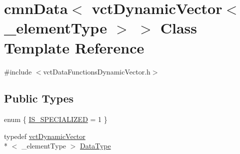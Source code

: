 \hypertarget{classcmn_data_3_01vct_dynamic_vector_3_01__element_type_01_4_01_4}{\section{cmn\-Data$<$ vct\-Dynamic\-Vector$<$ \-\_\-element\-Type $>$ $>$ Class Template Reference}
\label{classcmn_data_3_01vct_dynamic_vector_3_01__element_type_01_4_01_4}
}


{\ttfamily \#include $<$vct\-Data\-Functions\-Dynamic\-Vector.\-h$>$}

\subsection*{Public Types}
\begin{DoxyCompactItemize}
\item 
enum \{ \hyperlink{classcmn_data_3_01vct_dynamic_vector_3_01__element_type_01_4_01_4_a05c6f7604114348b65088b0b7724a152aca16809e1c2c0a0930f412fea81a9582}{I\-S\-\_\-\-S\-P\-E\-C\-I\-A\-L\-I\-Z\-E\-D} = 1
 \}
\item 
typedef \hyperlink{classvct_dynamic_vector}{vct\-Dynamic\-Vector}\\*
$<$ \-\_\-element\-Type $>$ \hyperlink{classcmn_data_3_01vct_dynamic_vector_3_01__element_type_01_4_01_4_a00a493d9c26fcb200ced1375b3500d17}{Data\-Type}
\end{DoxyCompactItemize}
